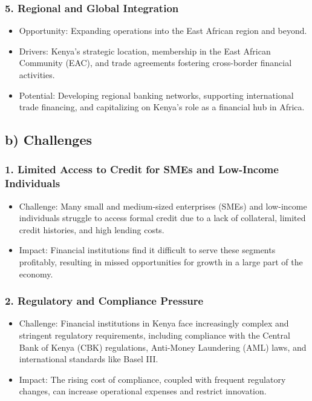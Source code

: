 \documentclass[10pt]{article}
\begin{document}
\subsubsection*{5. Regional and Global Integration}
\begin{itemize}
  \item Opportunity: Expanding operations into the East African region and beyond.
  \item Drivers: Kenya's strategic location, membership in the East African Community (EAC), and trade agreements fostering cross-border financial activities.
  \item Potential: Developing regional banking networks, supporting international trade financing, and capitalizing on Kenya's role as a financial hub in Africa.
\end{itemize}

\subsection*{b) Challenges}
\subsubsection*{1. Limited Access to Credit for SMEs and Low-Income Individuals}
\begin{itemize}
  \item Challenge: Many small and medium-sized enterprises (SMEs) and low-income individuals struggle to access formal credit due to a lack of collateral, limited credit histories, and high lending costs.
  \item Impact: Financial institutions find it difficult to serve these segments profitably, resulting in missed opportunities for growth in a large part of the economy.
\end{itemize}

\subsubsection*{2. Regulatory and Compliance Pressure}
\begin{itemize}
  \item Challenge: Financial institutions in Kenya face increasingly complex and stringent regulatory requirements, including compliance with the Central Bank of Kenya (CBK) regulations, Anti-Money Laundering (AML) laws, and international standards like Basel III.
  \item Impact: The rising cost of compliance, coupled with frequent regulatory changes, can increase operational expenses and restrict innovation.
\end{itemize}
\end{document}
